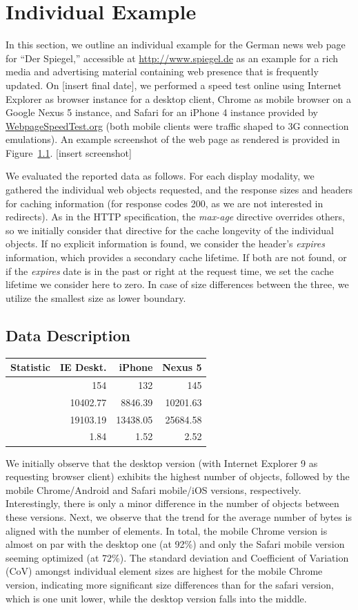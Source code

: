 \documentclass[letterpaper,conference]{IEEEtran}
\begin{document}
\section{Individual Example}
In this section, we outline an individual example for the German news web page for ``Der Spiegel,'' accessible at \url{http://www.spiegel.de} as an example for a rich media and advertising material containing web presence that is frequently updated.
On [insert final date], we performed a speed test online using Internet Explorer as browser instance for a desktop client, Chrome as mobile browser on a Google Nexus 5 instance, and Safari for an iPhone 4 instance provided by \url{WebpageSpeedTest.org} (both mobile clients were traffic shaped to 3G connection emulations).
An example screenshot of the web page as rendered is provided in Figure~\ref{}.
[insert screenshot]

We evaluated the reported data as follows. For each display modality, we gathered the individual web objects requested, and the response sizes and headers for caching information (for response codes 200, as we are not interested in redirects). As in the HTTP specification, the \emph{max-age} directive overrides others, so we initially consider that directive for the cache longevity of the individual objects. If no explicit information is found, we consider the header's \emph{expires} information, which provides a secondary cache lifetime. If both are not found, or if the \emph{expires} date is in the past or right at the request time, we set the cache lifetime we consider here to zero. In case of size differences between the three, we utilize the smallest size as lower boundary.

\subsection{Data Description}
\begin{tabular}{|l|r|r|r|}\hline
Statistic & IE Deskt. & iPhone & Nexus 5\\\hline
& 154 & 132 & 145 \\\hline
& 10402.77	& 8846.39	& 10201.63 \\\hline
& 19103.19	& 13438.05	& 25684.58 \\\hline
& 1.84	&  1.52 &	2.52 \\\hline
\end{tabular}

We initially observe that the desktop version (with Internet Explorer 9 as requesting browser client) exhibits the highest number of objects, followed by the mobile Chrome/Android and Safari mobile/iOS versions, respectively. 
Interestingly, there is only a minor difference in the number of objects between these versions.
Next, we observe that the trend for the average number of bytes is aligned with the number of elements. 
In total, the mobile Chrome version is almost on par with the desktop one (at 92\%) and only the Safari mobile version seeming optimized (at 72\%).
The standard deviation and Coefficient of Variation (CoV) amongst individual element sizes are highest for the mobile Chrome version, indicating more significant size differences than for the safari version, which is one unit lower, while the desktop version falls into the middle.
\end{document}
